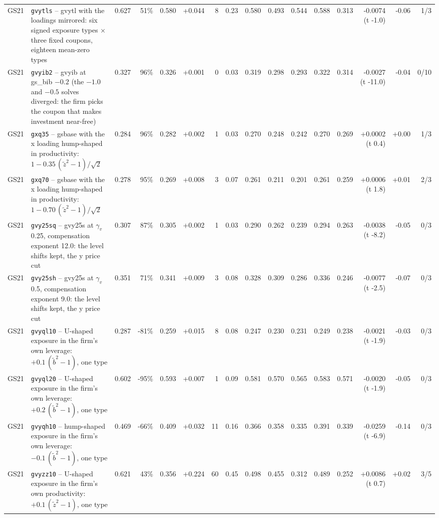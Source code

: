 \begin{landscape}
\begin{longtable}{lp{4.6cm}rrrrrrrrrrrrrr}
GS21 & \texttt{gvytls} -- gvytl with the loadings mirrored: six signed exposure types $\times$ three fixed coupons, eighteen mean-zero types & 0.627 & 51\% & 0.580 & +0.044 & 8 & 0.23 & 0.580 & 0.493 & 0.544 & 0.588 & 0.313 & -0.0074 (t -1.0) & -0.06 & 1/3 \\
GS21 & \texttt{gvyib2} -- gvyib at gs\_bib $-0.2$ (the $-1.0$ and $-0.5$ solves diverged: the firm picks the coupon that makes investment near-free) & 0.327 & 96\% & 0.326 & +0.001 & 0 & 0.03 & 0.319 & 0.298 & 0.293 & 0.322 & 0.314 & -0.0027 (t -11.0) & -0.04 & 0/10 \\
GS21 & \texttt{gxq35} -- gsbase with the x loading hump-shaped in productivity: $1 -0.35\,(\tilde z^2 - 1)/\sqrt2$ & 0.284 & 96\% & 0.282 & +0.002 & 1 & 0.03 & 0.270 & 0.248 & 0.242 & 0.270 & 0.269 & +0.0002 (t 0.4) & +0.00 & 1/3 \\
GS21 & \texttt{gxq70} -- gsbase with the x loading hump-shaped in productivity: $1 -0.70\,(\tilde z^2 - 1)/\sqrt2$ & 0.278 & 95\% & 0.269 & +0.008 & 3 & 0.07 & 0.261 & 0.211 & 0.201 & 0.261 & 0.259 & +0.0006 (t 1.8) & +0.01 & 2/3 \\
GS21 & \texttt{gvy25sq} -- gvy25s at $\gamma_v$ 0.25, compensation exponent 12.0: the level shifts kept, the y price cut & 0.307 & 87\% & 0.305 & +0.002 & 1 & 0.03 & 0.290 & 0.262 & 0.239 & 0.294 & 0.263 & -0.0038 (t -8.2) & -0.05 & 0/3 \\
GS21 & \texttt{gvy25sh} -- gvy25s at $\gamma_v$ 0.5, compensation exponent 9.0: the level shifts kept, the y price cut & 0.351 & 71\% & 0.341 & +0.009 & 3 & 0.08 & 0.328 & 0.309 & 0.286 & 0.336 & 0.246 & -0.0077 (t -2.5) & -0.07 & 0/3 \\
GS21 & \texttt{gvyql10} -- U-shaped exposure in the firm's own leverage: $+0.1\,(\tilde b^2 - 1)$, one type & 0.287 & -81\% & 0.259 & +0.015 & 8 & 0.08 & 0.247 & 0.230 & 0.231 & 0.249 & 0.238 & -0.0021 (t -1.9) & -0.03 & 0/3 \\
GS21 & \texttt{gvyql20} -- U-shaped exposure in the firm's own leverage: $+0.2\,(\tilde b^2 - 1)$, one type & 0.602 & -95\% & 0.593 & +0.007 & 1 & 0.09 & 0.581 & 0.570 & 0.565 & 0.583 & 0.571 & -0.0020 (t -1.9) & -0.05 & 0/3 \\
GS21 & \texttt{gvyqh10} -- hump-shaped exposure in the firm's own leverage: $-0.1\,(\tilde b^2 - 1)$, one type & 0.469 & -66\% & 0.409 & +0.032 & 11 & 0.16 & 0.366 & 0.358 & 0.335 & 0.391 & 0.339 & -0.0259 (t -6.9) & -0.14 & 0/3 \\
GS21 & \texttt{gvyzz10} -- U-shaped exposure in the firm's own productivity: $+0.1\,(\tilde z^2 - 1)$, one type & 0.621 & 43\% & 0.356 & +0.224 & 60 & 0.45 & 0.498 & 0.455 & 0.312 & 0.489 & 0.252 & +0.0086 (t 0.7) & +0.02 & 3/5 \\

\end{longtable}
\end{landscape}
